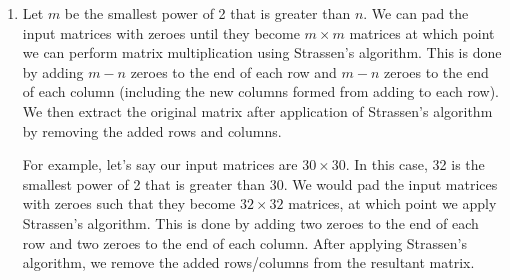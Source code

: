 \documentclass[11pt, letterpaper, titlepage]{article}
\begin{document}
\begin{enumerate}[label=\alph*.]
    \item Let $m$ be the smallest power of 2 that is greater than $n$. We can pad the input matrices with zeroes until they become $m \times m$ matrices at which point we can perform matrix multiplication using Strassen's algorithm. This is done by adding $m - n$ zeroes to the end of each row and $m - n$ zeroes to the end of each column (including the new columns formed from adding to each row). We then extract the original matrix after application of Strassen's algorithm by removing the added rows and columns.
    
    For example, let's say our input matrices are $30 \times 30$. In this case, 32 is the smallest power of 2 that is greater than 30. We would pad the input matrices with zeroes such that they become $32 \times 32$ matrices, at which point we apply Strassen's algorithm. This is done by adding two zeroes to the end of each row and two zeroes to the end of each column. After applying Strassen's algorithm, we remove the added rows/columns from the resultant matrix.
\end{enumerate}

\newpage
\end{document}

